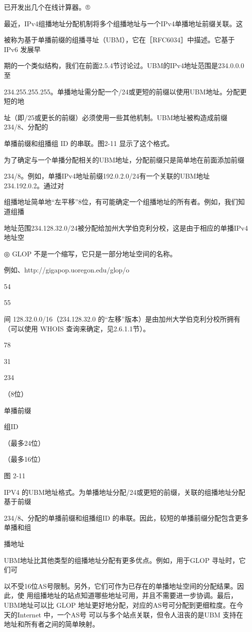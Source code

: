 已开发出几个在线计算器。®

最近，IPv4组播地址分配机制将多个组播地址与一个IPv4单播地址前缀关联。这

被称为基于单播前缀的组播寻址（UBM），它在［RFC6034］中描述。它基于 IPv6 发展早

期的一个类似结构，我们在前面2.5.4节讨论过。UBM的IPv4地址范围是234.0.0.0至

234.255.255.255。单播地址需分配一个/24或更短的前缀以使用UBM地址。分配更短的地

址（即/25或更长的前缀）必须使用一些其他机制。UBM地址被构造成前缀234/8、分配的

单播前缀和组播组 ID 的串联。图2-11 显示了这个格式。

为了确定与一个单播分配相关的UBM地址，分配前缀只是简单地在前面添加前缀

234/8。例如，单播IPv4地址前缀192.0.2.0/24有一个关联的UBM地址234.192.0.2。通过对

组播地址简单地“左平移”8位，有可能确定一个组播地址的所有者。例如，我们知道组播

地址范围234.128.32.0/24被分配给加州大学伯克利分校，这是由于相应的单播IPv4地址空

◎ GLOP 不是一个缩写，它只是一部分地址空间的名称。

例如、http://gigapop.uoregon.edu/glop/o

54

55

间 128.32.0.0/16（234.128.32.0 的“左移”版本）是由加州大学伯克利分校所拥有（可以使用
WHOIS 查询来确定，见2.6.1.1节）。

78

31

234

（8位）

单播前缀

组ID

（最多24位）

（最多16位）

图 2-11

IPV4 的UBM地址格式。为单播地址分配/24或更短的前缀，关联的组播地址分配基于前缀

234/8、分配的单播前缀和组播组ID 的串联。因此，较短的单播前缀分配包含更多单播和组

播地址

UBM地址比其他类型的组播地址分配有更多优点。例如，用于GLOP 寻址时，它们可

以不受16位AS号限制。另外，它们可作为已存在的单播地址空间的分配结果。因此，使
用组播地址的站点知道哪些地址可用，并且不需要进一步协调。最后，UBM地址可以比
GLOP 地址更好地分配，对应的AS号可分配到更细粒度。在今天的Internet 中，一个AS号
可以与多个站点关联，但令人沮丧的是UBM 支持在地址和所有者之间的简单映射。

